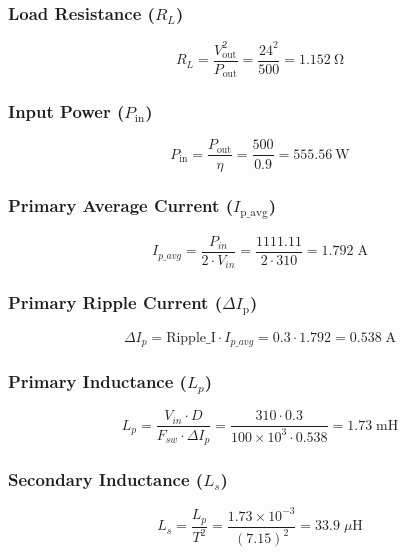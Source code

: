\subsubsection*{Load Resistance (\(R_L\))}
\begin{equation}
R_L = \frac{V_{\text{out}}^2}{P_{\text{out}}} = \frac{24^2}{500} = \boxed{\SI{1.152}{\ohm}}
\end{equation}

\subsubsection*{Input Power (\(P_{\text{in}}\))}
\begin{equation}
P_{\text{in}} = \frac{P_{\text{out}}}{\eta} = \frac{500}{0.9} = \boxed{\SI{555.56}{\watt}}
\end{equation}

\subsubsection*{Primary Average Current (\(I_{\text{p\_avg}}\))}
\begin{equation}
I_{p\_avg} = \frac{P_{in}}{2 \cdot V_{in}} = \frac{1111.11}{2 \cdot 310} = \boxed{1.792\;\text{A}} 
\end{equation}

\subsubsection*{Primary Ripple Current (\(\Delta I_{\text{p}}\))}
\begin{equation}
\Delta I_p = \text{Ripple\_I} \cdot I_{p\_avg} = 0.3 \cdot 1.792 = \boxed{0.538\;\text{A}}
\end{equation}

\subsubsection*{Primary Inductance (\(L_p\))}
\begin{equation}
L_p = \frac{V_{in} \cdot D}{F_{sw} \cdot \Delta I_p} = \frac{310 \cdot 0.3}{100 \times 10^3 \cdot 0.538} = \boxed{1.73\;\text{mH}}
\end{equation}

\subsubsection*{Secondary Inductance (\(L_s\))}
\begin{equation}
L_s = \frac{L_p}{T^2} = \frac{1.73 \times 10^{-3}}{(7.15)^2} = \boxed{33.9\;\mu\text{H}}
\end{equation}

